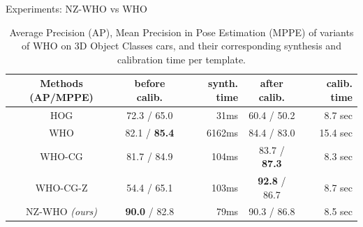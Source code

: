 \documentclass[serif,mathserif,final]{beamer}
\newcommand{\1}{\mathbb{I}} %
\begin{document}
\begin{frame}{}
\begin{columns}[t]
\begin{column}{0.24\linewidth}
      \begin{block}{Experiments: NZ-WHO vs WHO}
        \vspace{-1.0em}
        \begin{table}[!htbp]
          \small
          \setlength{\tabcolsep}{1pt}
          \centering
          \begin{tabular}{|c|c|r|c|r|}
            \hline
            Methods (AP/MPPE) & before calib.  & synth. time & after calib. & calib. time \\
            \hline\hline
            HOG      & 72.3 / 65.0          &  31ms  & 60.4 / 50.2           & 8.7 sec \\ 
            WHO  & 82.1 / \textbf{85.4} &  6162ms& 84.4 / 83.0           & 15.4 sec\\
            WHO-CG                 & 81.7 / 84.9          &  104ms & 83.7 / \textbf{87.3}  & 8.3 sec \\
            WHO-CG-Z               & 54.4 / 65.1          &  103ms & \textbf{92.8} / 86.7  & 8.7 sec \\
            NZ-WHO {\em (ours)} & \textbf{90.0} / 82.8 &   79ms & 90.3 / 86.8           & 8.5 sec \\
            \hline
          \end{tabular}
          \caption{\small Average Precision (AP), Mean Precision in Pose Estimation
            (MPPE) of variants of WHO on 3D Object Classes cars, and their
            corresponding synthesis and calibration time per template.}
          \label{tab:who_initializations}
        \end{table}
        \vspace{-1.5em}


      \end{block}
    \end{column}%




\end{columns}
\end{frame}
\end{document}
